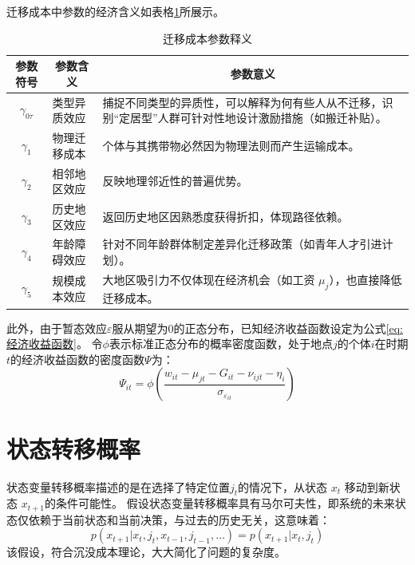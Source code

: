 \documentclass[a4paper,12pt,oneside, fontset=mac]{ctexbook} %
\begin{document}
迁移成本中参数的经济含义如表格\ref{tab:迁移成本参数释义}所展示。
\begin{table}[!ht]
  \centering
  \caption{迁移成本参数释义}
  \label{tab:迁移成本参数释义}
  \begin{tabularx}{\textwidth}{@{}llX@{}}
    \toprule
    \multicolumn{1}{c}{\textbf{参数符号}} & \multicolumn{1}{c}{\textbf{参数含义}} & \multicolumn{1}{c}{\textbf{参数意义}} \\ \midrule
    \multicolumn{1}{c}{$\gamma_{0\tau}$} & 类型异质效应 & 捕捉不同类型的异质性，可以解释为何有些人从不迁移，识别“定居型”人群可针对性地设计激励措施（如搬迁补贴）。\\ 
    \multicolumn{1}{c}{$\gamma_1$} & 物理迁移成本 & 个体与其携带物必然因为物理法则而产生运输成本。 \\ 
    \multicolumn{1}{c}{$\gamma_2$} & 相邻地区效应 & 反映地理邻近性的普遍优势。 \\ 
    \multicolumn{1}{c}{$\gamma_3$} & 历史地区效应 & 返回历史地区因熟悉度获得折扣，体现路径依赖。 \\ 
    \multicolumn{1}{c}{$\gamma_4$} & 年龄障碍效应 & 针对不同年龄群体制定差异化迁移政策（如青年人才引进计划）。\\ 
    \multicolumn{1}{c}{$\gamma_5$} & 规模成本效应 & 大地区吸引力不仅体现在经济机会（如工资 $\mu_j$），也直接降低迁移成本。\\ \bottomrule
  \end{tabularx}
\end{table}


此外，由于暂态效应$\varepsilon$服从期望为0的正态分布，已知经济收益函数设定为公式\ref{eq:经济收益函数}。
令$\phi$表示标准正态分布的概率密度函数，处于地点$j$的个体$i$在时期$t$的经济收益函数的密度函数$\Psi$为：
\begin{equation}
  \Psi_{it}=\phi(\frac{w_{it} - \mu_{jt} - G_{it} - \nu_{ijt} - \eta_i }{\sigma_{\varepsilon_{it}}})
  \label{eq:经济收益似然贡献}
\end{equation}


\section{状态转移概率}

状态变量转移概率描述的是在选择了特定位置$j_{t}$的情况下，从状态 $x_t$ 移动到新状态 $x_{t+1}$的条件可能性。
假设状态变量转移概率具有马尔可夫性，即系统的未来状态仅依赖于当前状态和当前决策，与过去的历史无关，这意味着：
\begin{equation}
  p(x_{t+1}|x_{t},j_{t},x_{t-1},j_{t-1},\ldots)=p(x_{t+1}|x_{t},j_{t})
\end{equation}
该假设，符合沉没成本理论，大大简化了问题的复杂度。
\end{document}
